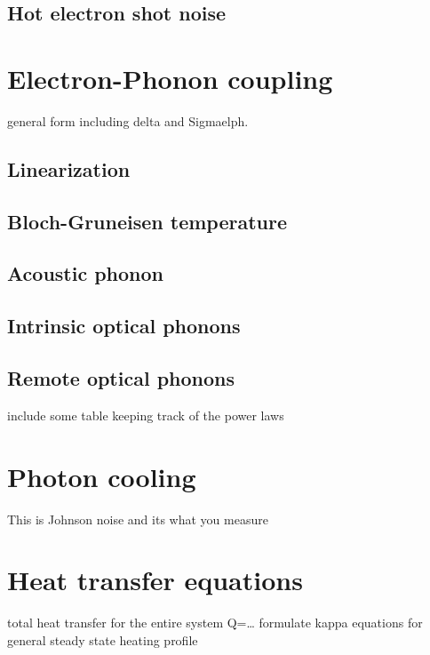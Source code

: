 \subsection{Hot electron shot noise}

\section{Electron-Phonon coupling}
general form including delta and Sigmaelph.

\subsection{Linearization}

\subsection{Bloch-Gruneisen temperature}

\subsection{Acoustic phonon}

\subsection{Intrinsic optical phonons}

\subsection{Remote optical phonons}
include some table keeping track of the power laws

\section{Photon cooling}
This is Johnson noise and its what you measure

\section{Heat transfer equations}
total heat transfer for the entire system Q=…
formulate kappa equations for general steady state heating profile
